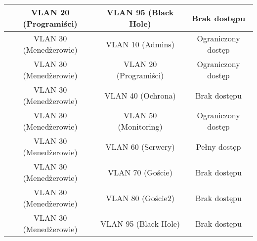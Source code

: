 \begin{table}[htbp]
\begin{tabular}{|c|c|c|}
VLAN 20 (Programiści)  & VLAN 95 (Black Hole)   & Brak dostępu         \\ \hline
VLAN 30 (Menedżerowie) & VLAN 10 (Admins)       & Ograniczony dostęp   \\ \hline
VLAN 30 (Menedżerowie) & VLAN 20 (Programiści)  & Ograniczony dostęp   \\ \hline
VLAN 30 (Menedżerowie) & VLAN 40 (Ochrona)      & Brak dostępu         \\ \hline
VLAN 30 (Menedżerowie) & VLAN 50 (Monitoring)   & Ograniczony dostęp   \\ \hline
VLAN 30 (Menedżerowie) & VLAN 60 (Serwery)      & Pełny dostęp         \\ \hline
VLAN 30 (Menedżerowie) & VLAN 70 (Goście)       & Brak dostępu         \\ \hline
VLAN 30 (Menedżerowie) & VLAN 80 (Goście2)      & Brak dostępu         \\ \hline
VLAN 30 (Menedżerowie) & VLAN 95 (Black Hole)   & Brak dostępu         \\ \hline
\end{tabular}
\end{table}


